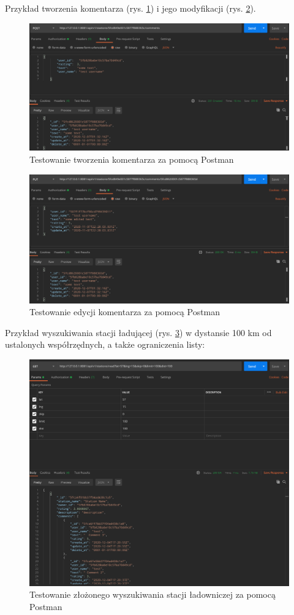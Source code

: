 Przykład tworzenia komentarza (rys. \ref{fig:postman_create_comment}) i jego modyfikacji (rys. \ref{fig:postman_edit_comment}).
\begin{figure}[ht]
    \centering
        \includegraphics[width=0.9\linewidth]{rys04/postman_create_comment.png}
        \caption{Testowanie tworzenia komentarza za pomocą Postman}
    \label{fig:postman_create_comment}
\end{figure}
\begin{figure}[ht]
    \centering
        \includegraphics[width=0.9\linewidth]{rys04/postman_edit_comment.png}
        \caption{Testowanie edycji komentarza za pomocą Postman}
    \label{fig:postman_edit_comment}
\end{figure}
\newpage
Przykład wyszukiwania stacji ładującej (rys. \ref{fig:postman_find_stations}) w dystansie 100 km od ustalonych współrzędnych, a także ograniczenia listy:
\begin{figure}[ht]
    \centering
        \includegraphics[width=0.9\linewidth]{rys04/postman_find_stations.png}
        \caption{Testowanie złożonego wyszukiwania stacji ładowniczej za pomocą Postman}
    \label{fig:postman_find_stations}
\end{figure}